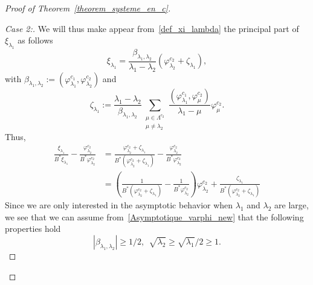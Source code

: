 \documentclass[11pt]{article}
\theoremstyle{definition}
\numberwithin{equation}{section}
\numberwithin{figure}{section}
\numberwithin{table}{section}
\newenvironment{step}[1]{\begin{proof}[#1]}{\let\qed\relax\end{proof}}
\newcommand{\fprop}[2]{\varphi^{#1}_{#2}}
\begin{document}
\begin{proof}[Proof of Theorem~\ref{theorem_systeme_en_c}]
\begin{step}{Case 2:}
We will thus make appear from~\eqref{def_xi_lambda} the principal part of $\xi_{\lambda_1}$ as follows
\[
\xi_{\lambda_1} = \frac{\beta_{\lambda_1,\lambda_2}}{\lambda_1-\lambda_2} \left(\fprop{c_2}{\lambda_2} + \zeta_{\lambda_1}\right),
\]
with $\beta_{\lambda_1,\lambda_2} := (\fprop{c_1}{\lambda_1},\fprop{c_2}{\lambda_2})$ and
\[
\zeta_{\lambda_1} := \frac{\lambda_1-\lambda_2}{\beta_{\lambda_1,\lambda_2}} \sum_{\substack{\mu\in \Lambda^{c_2}\\ \mu\neq\lambda_2}} \frac{\left(\fprop{c_1}{\lambda_1},\fprop{c_2}{\mu}\right)}{\lambda_1-\mu} \fprop{c_2}{\mu}.
\]
Thus,
\begin{equation}\label{MiseEnValeurCompensation}
\begin{aligned}
\frac{\xi_{\lambda_1}}{B^* \xi_{\lambda_1}} - \frac{\fprop{c_2}{\lambda_2}}{B^* \fprop{c_2}{\lambda_2}} &=
\frac{\fprop{c_2}{\lambda_2}+\zeta_{\lambda_1}}{B^*(\fprop{c_2}{\lambda_2}+\zeta_{\lambda_1}) } - \frac{\fprop{c_2}{\lambda_2}}{B^* \fprop{c_2}{\lambda_2}}
\\
&= \left(\frac{1}{B^* (\fprop{c_2}{\lambda_2}+\zeta_{\lambda_1})} - \frac{1}{B^* \fprop{c_2}{\lambda_2}} \right) \fprop{c_2}{\lambda_2} + \frac{\zeta_{\lambda_1}}{B^* \left(\fprop{c_2}{\lambda_2}+\zeta_{\lambda_1}\right)}
\end{aligned}
\end{equation}
Since we are only interested in the asymptotic behavior when $\lambda_1$ and $\lambda_2$ are large, we see that we can assume from~\eqref{Asymptotique_varphi_new} that the following properties hold
\begin{equation}\label{lambda_est_grand}
|\beta_{\lambda_1,\lambda_2}| \geq 1/2, \ \ \sqrt{\lambda_2}\geq \sqrt{\lambda_1}/2\geq 1.
\end{equation}


\end{step}
\end{proof}
\end{document}
